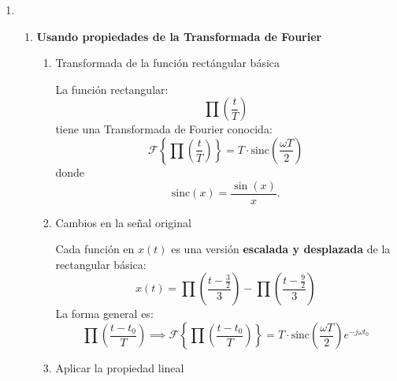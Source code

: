 \begin{enumerate}[label=\color{red}\textbf{\alph*)}]
	\item {}

\begin{enumerate}[label=\bfseries Forma \arabic*:]
    \item \textbf{Usando propiedades de la Transformada de Fourier}

        \begin{enumerate}[label=Paso \arabic*:]
            \item Transformada de la función rectángular básica

                La función rectangular: \[
                \prod\left( \dfrac{t}{T} \right) 
                \] 
                tiene una Transformada de Fourier conocida: \[
                \mathcal{F}\left\{ \prod\left( \dfrac{t}{T} \right)  \right\} =T\cdot \text{sinc}\left( \dfrac{\omega T}{2} \right) 
                \] donde  \[
                \text{sinc}(x)=\dfrac{\sin(x)}{x}.
                \] 
            \item Cambios en la señal original

                Cada función en  $x(t)$ es una versión  \textbf{escalada y desplazada} de la rectangular básica: 
                \[
                x(t)=\prod\left( \dfrac{t-\frac{3}{2} }{3} \right) - \prod\left( \dfrac{t-\frac{9}{2} }{3} \right) 
                \] 
                La forma general es: \[
                \prod\left( \dfrac{t-t_0}{T} \right) \implies \mathcal{F}\left\{ \prod\left( \dfrac{t-t_0}{T} \right)  \right\} =T\cdot \text{sinc}\left( \dfrac{\omega T}{2} \right) e^{-j\omega t_0} 
                \] 
            \item Aplicar la propiedad lineal


\end{enumerate}
\end{enumerate}
\end{enumerate}
